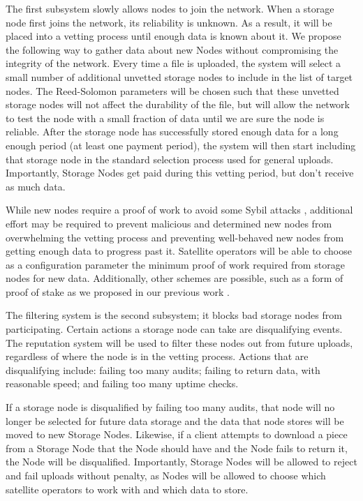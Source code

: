 \documentclass[8pt,fleqn,openany]{book}
\begin{document}
The first subsystem slowly allows nodes to join the network.
When a storage node first joins the network, its reliability is unknown.
As a result, it will be placed into a vetting
process until enough data is known about it.
We propose the following way to gather data about new Nodes
without compromising the integrity of the network.
Every time a file is uploaded, the system will select a small number of
additional unvetted storage nodes to include in the list of target nodes.
The Reed-Solomon parameters will be chosen such that these unvetted storage
nodes will not affect the durability of the file, but will allow the network
to test the node
with a small fraction of data until we are sure the node is reliable.
After the storage node has successfully stored enough data for a long enough
period (at least one payment period),
the system will then start including that storage
node in the standard selection process used for general uploads.
Importantly, Storage Nodes get paid during this
vetting period, but don't receive as much data.

While new nodes require a proof of work to avoid some Sybil attacks
\cite{sybil-attack}, additional effort may be required to prevent
malicious and determined new nodes from overwhelming the vetting process and
preventing well-behaved new nodes from getting enough data to progress past it.
Satellite operators will be able to choose as a configuration
parameter the minimum proof of work required from storage nodes for new data.
Additionally, other schemes are possible, such as a form of proof of stake as
we proposed in our previous work \cite{sybil-cost}.

The filtering system is the second subsystem; it blocks bad storage nodes from
participating.
Certain actions a storage node can take are disqualifying events. The
reputation system will be used to filter these nodes out from future uploads,
regardless of where the node is in the vetting process.
Actions that are disqualifying include: failing too many audits;
failing to return data, with reasonable speed; and failing too many uptime
checks.

If a storage node is disqualified by failing too many audits, that node will no
longer be selected for future data storage and the data that node stores will
be moved to new Storage Nodes.
Likewise, if a client attempts to download a piece from a Storage Node that
the Node should have and the Node fails to return it, the
Node will be disqualified. Importantly, Storage Nodes will be allowed to reject
and fail uploads without penalty, as Nodes will be allowed to choose which
satellite operators to work with and which data to store.
\end{document}
